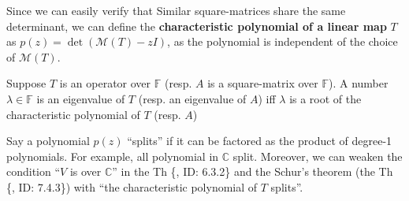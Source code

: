 \documentclass{article}
\begin{document}
\begin{Rmk}{}
    \begin{compactenum}
        \item Since we can easily verify that \textcolor{Th}{Similar square-matrices share the same determinant}, \textcolor{Df}{we can define the \textbf{characteristic polynomial of a linear map} $T$ as $p(z) = \det (\mathcal{M}(T)-zI)$}, as the polynomial is independent of the choice of $\mathcal{M}(T)$.
        \item \textcolor{Th}{Suppose $T$ is an operator over $\mathbb{F}$ (resp. $A$ is a square-matrix over $\mathbb{F}$). A number $\lambda\in\mathbb{F}$ is an eigenvalue of $T$ (resp. an eigenvalue of $A$) iff $\lambda$ is a root of the characteristic polynomial of $T$ (resp. $A$)}
        \item \textcolor{Df}{Say a polynomial $p(z)$ ``splits'' if it can be factored as the product of degree-1 polynomials.} For example, \textcolor{Th}{all polynomial in $\mathbb{C}$ split.} Moreover, \textcolor{Th}{we can weaken the condition ``$V$ is over $\mathbb{C}$'' in the Th \{, ID: 6.3.2\} and the Schur's theorem (the Th \{, ID: 7.4.3\}) with ``the characteristic polynomial of $T$ splits''.}
    \end{compactenum}
\end{Rmk}
\end{document}
